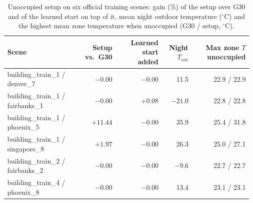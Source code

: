 \begin{table}[!htbp]
\centering
\setlength{\tabcolsep}{4pt}
\caption{Unoccupied setup on six official training scenes: gain (\%) of the setup over G30 and of the learned start on
top of it, mean night outdoor temperature ($^\circ$C) and the highest mean zone temperature when unoccupied (G30 /
setup, $^\circ$C).}
\label{tab:uns}
\footnotesize
\begin{tabular}{lrrrr}
\toprule
Scene & Setup vs.\ G30 & Learned start added & Night $T_{\mathrm{out}}$ & Max zone $T$ unoccupied\\
\midrule
building\_train\_1 / denver\_7 & $-0.00$ & $-0.00$ & 11.5 & 22.9 / 22.9\\
building\_train\_1 / fairbanks\_1 & $-0.00$ & $+0.08$ & $-21.0$ & 22.8 / 22.8\\
building\_train\_1 / phoenix\_5 & $+11.44$ & $-0.00$ & 35.9 & 25.4 / 31.8\\
building\_train\_1 / singapore\_8 & $+1.97$ & $-0.00$ & 26.3 & 25.0 / 27.1\\
building\_train\_2 / fairbanks\_2 & $-0.00$ & $-0.00$ & $-9.6$ & 22.7 / 22.7\\
building\_train\_4 / phoenix\_8 & $-0.00$ & $-0.00$ & 13.4 & 23.1 / 23.1\\
\bottomrule
\end{tabular}
\end{table}

